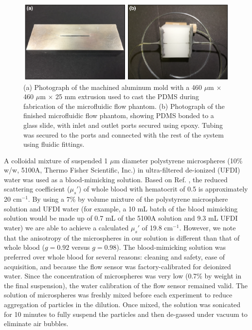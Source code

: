 \documentclass[12pt]{spieman}
\begin{document}
\begin{spacing}{2}
\begin{figure}
    \includegraphics[width=\textwidth]{Figure1.pdf}
    \caption {
        (a) Photograph of the machined aluminum mold with a 460 $\mu$m $\times$ 460 $\mu$m $\times$ 25 mm extrusion used to cast the PDMS during fabrication of the microfluidic flow phantom. (b) Photograph of the finished microfluidic flow phantom, showing PDMS bonded to a glass slide, with inlet and outlet ports secured using epoxy. Tubing was secured to the ports and connected with the rest of the system using fluidic fittings.
    }
    \label{fig:microfluidic}
\end{figure}

A colloidal mixture of suspended 1 $\mu$m diameter polystyrene microspheres (10\% w/w, 5100A, Thermo Fisher Scientific, Inc.) in ultra-filtered de-ionized (UFDI) water was used as a blood-mimicking solution. Based on Ref. \cite[]{Roggan:1999bz}, the reduced scattering coefficient ($\mu_s'$) of whole blood with hematocrit of 0.5 is approximately 20 cm$^{-1}$. By using a 7\% by volume mixture of the polystyrene microsphere solution and UFDI water (for example, a 10 mL batch of the blood mimicking solution would be made up of 0.7 mL of the 5100A solution and 9.3 mL UFDI water) we are able to achieve a calculated $\mu_s'$ of 19.8 cm$^{-1}$. However, we note that the anisotropy of the microspheres in our solution is different than that of whole blood ($g = 0.92$ versus $g = 0.98$). The blood-mimicking solution was preferred over whole blood for several reasons: cleaning and safety, ease of acquisition, and because the flow sensor was factory-calibrated for deionized water. Since the concentration of microspheres was very low (0.7\% by weight in the final suspension), the water calibration of the flow sensor remained valid. The solution of microspheres was freshly mixed before each experiment to reduce aggregation of particles in the dilution. Once mixed, the solution was sonicated for 10 minutes to fully suspend the particles and then de-gassed under vacuum to eliminate air bubbles.



\end{spacing}
\end{document}
